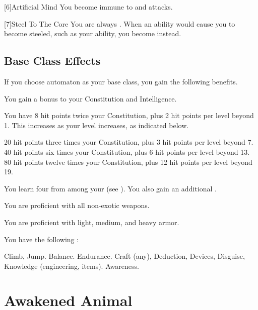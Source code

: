     [6]{Artificial Mind} You become immune to  and  attacks.

    [7]{Steel To The Core} You are always \steeled.
    When an ability would cause you to become steeled, such as your  ability, you become \braced instead.

  \subsection{Base Class Effects}
    If you choose automaton as your base class, you gain the following benefits.

     You gain a  bonus to your Constitution and Intelligence.

      You have 8 hit points \add twice your Constitution, plus 2 hit points per level beyond 1.
      This increases as your level increases, as indicated below.
      \begin{itemize}
         20 hit points \add three times your Constitution, plus 3 hit points per level beyond 7.
         40 hit points \add six times your Constitution, plus 6 hit points per level beyond 13.
         80 hit points \add twelve times your Constitution, plus 12 hit points per level beyond 19.
      \end{itemize}

      You learn four  from among your  (see ). You also gain an additional .

      You are proficient with all non-exotic weapons.

      You are proficient with light, medium, and heavy armor.

      You have the following :
      \begin{itemize}
         Climb, Jump.
         Balance.
         Endurance.
         Craft (any), Deduction, Devices, Disguise, Knowledge (engineering, items).
         Awareness.
      \end{itemize}

\section{Awakened Animal}

